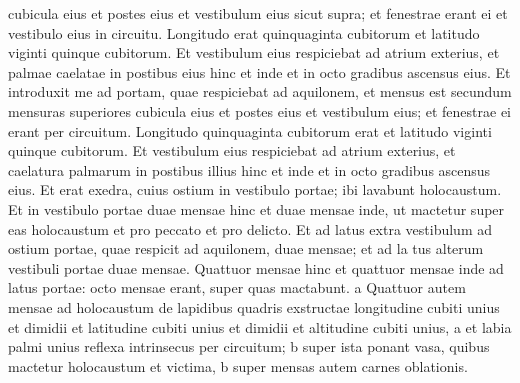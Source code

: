 \begin{biblechapter}
\begin{biblechapter}
\begin{biblechapter}
\begin{biblechapter}
\begin{biblechapter}
\begin{biblechapter}
\begin{biblechapter}
\begin{biblechapter}
\begin{biblechapter}
\begin{biblechapter}
\begin{biblechapter}
\begin{biblechapter}
\begin{biblechapter}
\begin{biblechapter}
\begin{biblechapter}
\begin{biblechapter}
\begin{biblechapter}
\begin{biblechapter}
\begin{biblechapter}
\begin{biblechapter}
\begin{biblechapter}
\begin{biblechapter}
\begin{biblechapter}
\begin{biblechapter}
\begin{biblechapter}
\begin{biblechapter}
\begin{biblechapter}
\begin{biblechapter}
\begin{biblechapter}
\begin{biblechapter}
\begin{biblechapter}
\begin{biblechapter}
\begin{biblechapter}
\begin{biblechapter}
\begin{biblechapter}
\begin{biblechapter}
\begin{biblechapter}
\begin{biblechapter}
\begin{biblechapter}
\begin{biblechapter}
\verse cubicula eius et postes eius et vestibulum eius sicut supra; et fenestrae erant ei et vestibulo eius in circuitu. Longitudo erat quinquaginta cubitorum et latitudo viginti quinque cubitorum. 
\verse Et vestibulum eius respiciebat ad atrium exterius, et palmae caelatae in postibus eius hinc et inde et in octo gradibus ascensus eius. 
\verse Et introduxit me ad portam, quae respiciebat ad aquilonem, et mensus est secundum mensuras superiores 
\verse cubicula eius et postes eius et vestibulum eius; et fenestrae ei erant per circuitum. Longitudo quinquaginta cubitorum erat et latitudo viginti quinque cubitorum. 
\verse Et vestibulum eius respiciebat ad atrium exterius, et caelatura palmarum in postibus illius hinc et inde et in octo gradibus ascensus eius.
 \verse Et erat exedra, cuius ostium in vestibulo portae; ibi lavabunt holocaustum. 
\verse Et in vestibulo portae duae mensae hinc et duae mensae inde, ut mactetur super eas holocaustum et pro peccato et pro delicto. 
\verse Et ad latus extra vestibulum ad ostium portae, quae respicit ad aquilonem, duae mensae; et ad la tus alterum vestibuli portae duae mensae. 
\verse Quattuor mensae hinc et quattuor mensae inde ad latus portae: octo mensae erant, super quas mactabunt. 
 \verse a Quattuor autem mensae ad holocaustum de lapidibus quadris exstructae longitudine cubiti unius et dimidii et latitudine cubiti unius et dimidii et altitudine cubiti unius, 
\verse a et labia palmi unius reflexa intrinsecus per circuitum; 
\verse b super ista ponant vasa, quibus mactetur holocaustum et victima, 
 \verse b super mensas autem carnes oblationis. 

\end{biblechapter}
\end{biblechapter}
\end{biblechapter}
\end{biblechapter}
\end{biblechapter}
\end{biblechapter}
\end{biblechapter}
\end{biblechapter}
\end{biblechapter}
\end{biblechapter}
\end{biblechapter}
\end{biblechapter}
\end{biblechapter}
\end{biblechapter}
\end{biblechapter}
\end{biblechapter}
\end{biblechapter}
\end{biblechapter}
\end{biblechapter}
\end{biblechapter}
\end{biblechapter}
\end{biblechapter}
\end{biblechapter}
\end{biblechapter}
\end{biblechapter}
\end{biblechapter}
\end{biblechapter}
\end{biblechapter}
\end{biblechapter}
\end{biblechapter}
\end{biblechapter}
\end{biblechapter}
\end{biblechapter}
\end{biblechapter}
\end{biblechapter}
\end{biblechapter}
\end{biblechapter}
\end{biblechapter}
\end{biblechapter}
\end{biblechapter}
